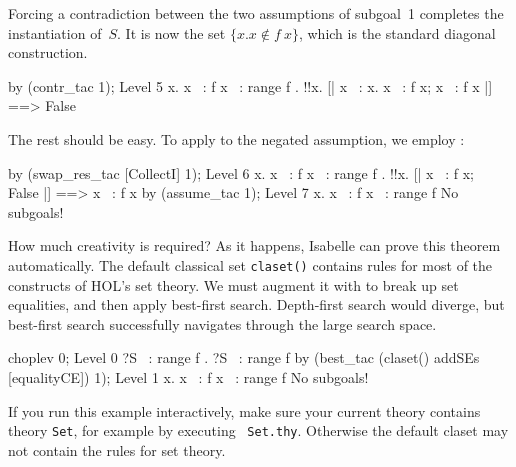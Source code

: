 Forcing a contradiction between the two assumptions of subgoal~1
completes the instantiation of~$S$.  It is now the set $\{x. x\not\in
f~x\}$, which is the standard diagonal construction.
\begin{ttbox}
by (contr_tac 1);
{\out Level 5}
{\out {\ttlbrace}x. x ~: f x{\ttrbrace} ~: range f}
{. !!x. [| x ~: {\ttlbrace}x. x ~: f x{\ttrbrace}; x ~: f x |] ==> False}
\end{ttbox}
The rest should be easy.  To apply  to the negated
assumption, we employ :
\begin{ttbox}
by (swap_res_tac [CollectI] 1);
{\out Level 6}
{\out {\ttlbrace}x. x ~: f x{\ttrbrace} ~: range f}
{. !!x. [| x ~: f x; ~ False |] ==> x ~: f x}
\ttbreak
by (assume_tac 1);
{\out Level 7}
{\out {\ttlbrace}x. x ~: f x{\ttrbrace} ~: range f}
{\out No subgoals!}
\end{ttbox}
How much creativity is required?  As it happens, Isabelle can prove this
theorem automatically.  The default classical set \texttt{claset()} contains
rules for most of the constructs of HOL's set theory.  We must augment it with
 to break up set equalities, and then apply best-first search.
Depth-first search would diverge, but best-first search successfully navigates
through the large search space.  
\begin{ttbox}
choplev 0;
{\out Level 0}
{\out ?S ~: range f}
{. ?S ~: range f}
\ttbreak
by (best_tac (claset() addSEs [equalityCE]) 1);
{\out Level 1}
{\out {\ttlbrace}x. x ~: f x{\ttrbrace} ~: range f}
{\out No subgoals!}
\end{ttbox}
If you run this example interactively, make sure your current theory contains
theory \texttt{Set}, for example by executing ~{\tt Set.thy}.
Otherwise the default claset may not contain the rules for set theory.

